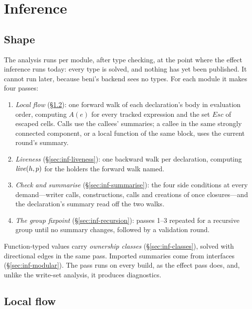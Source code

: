 \chapter{Inference}
\label{sec:inference}

\section{Shape}
\label{sec:inf-shape}

The analysis runs per module, after type checking, at the point where the effect inference runs
today: every type is solved, and nothing has yet been published. It cannot run later, because
beni's backend sees no types. For each module it makes four passes:

\begin{enumerate}
\item \emph{Local flow} (\S\ref{sec:inf-flow}): one forward walk of each declaration's body in
evaluation order, computing $A(e)$ for every tracked expression and the set $\mathit{Esc}$ of escaped
cells. Calls use the callees' summaries; a callee in the same strongly connected component, or a local
function of the same block, uses the current round's summary.
\item \emph{Liveness} (\S\ref{sec:inf-liveness}): one backward walk per declaration, computing
$\mathit{live}(h, p)$ for the holders the forward walk named.
\item \emph{Check and summarise} (\S\ref{sec:inf-summarise}): the four side conditions at every
demand---writer calls, constructions, calls and creations of once closures---and the declaration's
summary read off the two walks.
\item \emph{The group fixpoint} (\S\ref{sec:inf-recursion}): passes 1--3 repeated for a recursive
group until no summary changes, followed by a validation round.
\end{enumerate}

Function-typed values carry \emph{ownership classes} (\S\ref{sec:inf-classes}), solved with
directional edges in the same pass. Imported summaries come from interfaces
(\S\ref{sec:inf-modular}). The pass runs on every build, as the effect pass does, and, unlike the
write-set analysis, it produces diagnostics.

\section{Local flow}
\label{sec:inf-flow}

